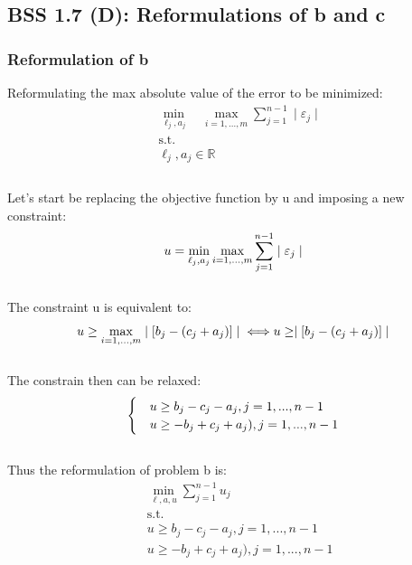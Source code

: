\documentclass[12pt]{article}
\begin{document}
\subsection{BSS 1.7 (D): Reformulations of b and c}
\subsubsection{Reformulation of b}
Reformulating the max absolute value of the error to be minimized: 
    \begin{align*}
            &\min_{\ell_j,a_j} \quad \max_{i=1,...,m} \sum_{j=1}^{n-1} \mid \varepsilon_j \mid\\
            &\text{s.t.}\\
            &\ell_j, a_j \in \mathbb{R} \\
    \end{align*}\\
Let's start be replacing the objective function by u and imposing a new constraint:\\
    \begin{equation*}
        u = \min_{\ell_j,a_j} \max_{i=1,...,m} \sum_{j=1}^{n-1} \mid \varepsilon_j \mid\\
    \end{equation*}\\
The constraint u is equivalent to:\\
    \begin{equation*}
        u \geq \max_{i=1,...,m} \mid [b_j-(c_j + a_j)]\mid\\
        \Longleftrightarrow\\
        u \geq \mid [b_j-(c_j + a_j)]\mid\\
    \end{equation*}\\

The constrain then can be relaxed:\\
   \begin{equation*}
        \begin{cases}
            &u \geq b_j - c_j - a_j  , j = 1,...,n-1\\
            &u \geq -b_j + c_j + a_j), j = 1,...,n-1\\
        \end{cases}\\
    \end{equation*}\\
Thus the reformulation of problem b is: 
    \begin{align*}
        &\min_{\ell, a, u} \sum_{j=1}^{n-1} u_j\\
        &\text{s.t.}\\
        &u \geq b_j - c_j - a_j  , j = 1,...,n-1\\
        &u \geq -b_j + c_j + a_j), j = 1,...,n-1\\
    \end{align*}
\end{document}
